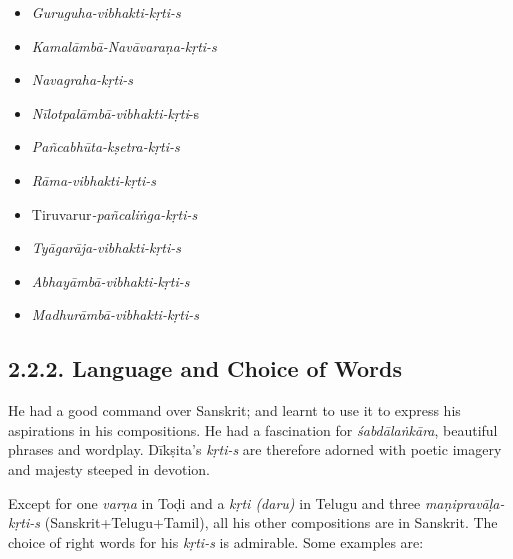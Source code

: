 \begin{itemize}
\itemsep=0pt
\item \textit{Guruguha-vibhakti-kṛti-s}

 \item \textit{Kamalāmbā-Navāvaraṇa-kṛti-s}

 \item \textit{Navagraha-kṛti-s}

 \item \textit{Nīlotpalāmbā-vibhakti-kṛti}-s

 \item \textit{Pañcabhūta-kṣetra-kṛti-s}

 \item \textit{Rāma-vibhakti-kṛti-s}

 \item Tiruvarur\textit{-pañcaliṅga-kṛti-s}

 \item \textit{Tyāgarāja-vibhakti-kṛti-s}

 \item \textit{Abhayāmbā-vibhakti-kṛti-s}

 \item \textit{Madhurāmbā-vibhakti-kṛti-s}

\end{itemize}



\subsection*{2.2.2. Language and Choice of Words}

He had a good command over Sanskrit; and learnt to use it to express his aspirations in his compositions. He had a fascination for \textit{śabdālaṅkāra}, beautiful phrases and wordplay. Dīkṣita’s \textit{kṛti-s} are therefore adorned with poetic imagery and majesty steeped in devotion.

Except for one \textit{varṇa} in Toḍi and a\textit{ kṛti (daru)} in Telugu and three \textit{maṇipravāḷa- kṛti-s} (Sanskrit+Telugu+Tamil), all his other compositions are in Sanskrit. The choice of right words for his \textit{kṛti-s} is admirable. Some examples are:

